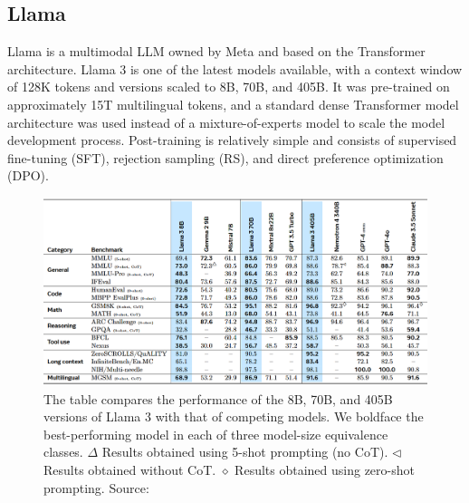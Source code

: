 \documentclass[12pt]{article}
\begin{document}
    \subsection{Llama}
    Llama is a multimodal LLM owned by Meta and based on the Transformer architecture. 
Llama 3 is one of the latest models available, with a context window of 128K tokens and versions scaled to 8B, 70B, and 405B. It was pre-trained on approximately 15T multilingual tokens, and a standard dense Transformer model architecture was used instead of a mixture-of-experts model to scale the model development process. Post-training is relatively simple and consists of supervised fine-tuning (SFT), rejection sampling (RS), and direct preference optimization (DPO).\cite{grattafiori2024llama3herdmodels}

    \begin{figure}[H]
    \centering
            \includegraphics[width=1\textwidth]{Llama3Benchmarks.png}
    \caption[Llama 3 benchmarks]{The table compares the performance of the 8B, 70B, and 405B versions of Llama 3 with that of competing models. We boldface the best-performing model in each of three model-size equivalence classes. $\Delta$ Results obtained using 5-shot prompting (no CoT). $\triangleleft$ Results obtained without CoT. $\diamond$ Results obtained using zero-shot prompting. Source: \cite{grattafiori2024llama3herdmodels}}
    \end{figure}    
    
\end{document}
